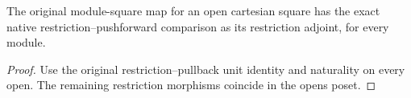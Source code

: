 \begin{lemma}
\label{lem:kn-nadel-native-open-module-square}
\leanok
The original module-square map for an open cartesian square has the exact native
restriction--pushforward comparison as its restriction adjoint, for every module.
\end{lemma}
\begin{proof}
Use the original restriction--pullback unit identity and naturality on every open.
The remaining restriction morphisms coincide in the opens poset.
\end{proof}

